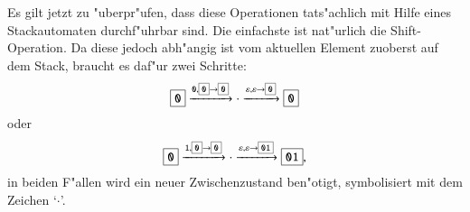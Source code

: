 Es gilt jetzt zu "uberpr"ufen, dass diese Operationen tats"achlich mit
Hilfe eines Stackautomaten durchf"uhrbar sind. Die einfachste ist nat"urlich
die Shift-Ope\-ration. Da diese jedoch abh"angig ist vom aktuellen Element zuoberst
auf dem Stack, braucht es daf"ur zwei Schritte:
\[
\boxed{\texttt{0}}\xrightarrow{\texttt{0},\scalebox{0.7}{\boxed{\texttt{0}}$\rightarrow$\boxed{\texttt{0}}}}\cdot
\xrightarrow{\varepsilon,\varepsilon\rightarrow\scalebox{0.7}{\boxed{\texttt{0}}}}\boxed{\texttt{0}}
\]
oder
\[
\boxed{\texttt{0}}\xrightarrow{\texttt{1},\scalebox{0.7}{\boxed{\texttt{0}}$\rightarrow$\boxed{\texttt{0}}}}\cdot
\xrightarrow{\varepsilon,\varepsilon\rightarrow\scalebox{0.7}{\boxed{\texttt{01}}}}\boxed{\texttt{01}},
\]
in beiden F"allen wird ein neuer Zwischenzustand ben"otigt, symbolisiert mit dem Zeichen
`$\cdot$'.

